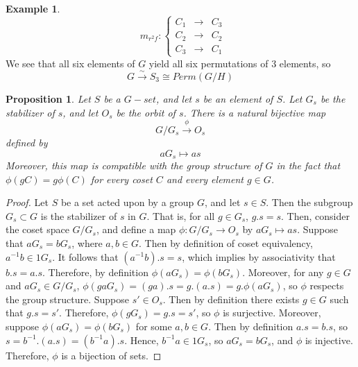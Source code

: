 \documentclass[12pt]{article}
\newtheorem{prop}[thm]{Proposition}
\theoremstyle{definition}
\newtheorem{eg}[thm]{Example}
\theoremstyle{remark}
\numberwithin{equation}{section}
\begin{document}
\begin{eg}
\begin{equation}
                                \;\;m_{r^2f}:\left\{\begin{array}{ccc} C_1 & \rightarrow & C_3 \\ C_2 & \rightarrow & C_2 \\ C_3 & \rightarrow & C_1 \end{array}\right.
        \end{equation}
        We see that all six elements of $G$ yield all six permutations of 3 elements, so \begin{equation}
                G \xrightarrow{\sim}S_3 \cong Perm(G/H)
        \end{equation}
\end{eg}


\vspace{15pt}

\begin{prop}
        Let $S$ be a $G-set$, and let $s$ be an element of $S$. Let $G_s$ be the stabilizer of $s$, and let $O_s$ be the orbit of $s$. There is a natural bijective map\begin{equation}
                G/G_s\xrightarrow{\phi}O_s
        \end{equation}
        defined by \begin{equation}
                aG_s\mapsto as
        \end{equation}
        Moreover, this map is compatible with the group structure of $G$ in the fact that $\phi(gC) = g\phi(C)$ for every coset $C$ and every element $g \in G$. 
\end{prop}
\begin{proof}
        Let $S$ be a set acted upon by a group $G$, and let $s \in S$. Then the subgroup $G_s \subset G$ is the stabilizer of $s$ in $G$. That is, for all $g \in G_s$, $g.s = s$. Then, consider the coset space $G/G_s$, and define a map $\phi:G/G_s \rightarrow O_s$ by $aG_s \mapsto as$. Suppose that $aG_s = bG_s$, where $a,b \in G$. Then by definition of coset equivalency, $a^{-1}b \in 1G_s$. It follows that $(a^{-1}b).s = s$, which implies by associativity that $b.s = a.s$. Therefore, by definition $\phi(aG_s) = \phi(bG_s)$. Moreover, for any $g \in G$ and $aG_s \in G/G_s$, $\phi(gaG_s) = (ga).s = g.(a.s) = g.\phi(aG_s)$, so $\phi$ respects the group structure. Suppose $s' \in O_s$. Then by definition there exists $g \in G$ such that $g.s = s'$. Therefore, $\phi(gG_s) = g.s = s'$, so $\phi$ is surjective. Moreover, suppose $\phi(aG_s) = \phi(bG_s)$ for some $a,b \in G$. Then by definition $a.s = b.s$, so $s = b^{-1}.(a.s) = (b^{-1}a).s$. Hence, $b^{-1}a \in 1G_s$, so $aG_s = bG_s$, and $\phi$ is injective. Therefore, $\phi$ is a bijection of sets.
\end{proof}
\end{document}
